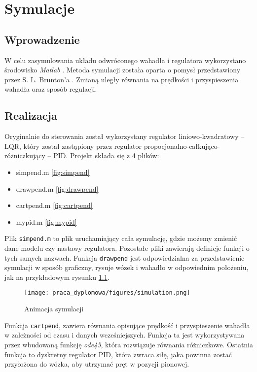 \chapter{Symulacje}

\section{Wprowadzenie}
W celu zasymulowania układu odwróconego wahadła i regulatora wykorzystano środowisko \textit{Matlab} \cite{matlab}. Metoda symulacji została oparta o pomysł przedstawiony przez S. L. Brunton'a \cite{Brun17}. Zmianą uległy równania na prędkości i przyspieszenia wahadła oraz sposób regulacji.

\section{Realizacja}
Oryginalnie do sterowania został wykorzystany regulator liniowo-kwadratowy -- LQR, który został  zastąpiony przez regulator propocjonalno-całkująco-różniczkujący -- PID. Projekt składa się z 4 plików:
\begin{itemize}
    \item simpend.m \ref{fig:simpend}
    \item drawpend.m \ref{fig:drawpend}
    \item cartpend.m \ref{fig:cartpend}
    \item mypid.m \ref{fig:mypid}
\end{itemize}
Plik \texttt{simpend.m} to plik uruchamiający cała symulację, gdzie możemy zmienić dane modelu czy nastawy regulatora. Pozostałe pliki zawierają definicje funkcji o tych samych nazwach. Funkcja \texttt{drawpend} jest odpowiedzialna za przedstawienie symulacji w sposób graficzny, rysuje wózek i wahadło w odpowiednim położeniu, jak na przykładowym rysunku \ref{fig:sim}.
\begin{figure}
    \centering
    \texttt{[image: praca\_dyplomowa/figures/simulation.png]}
    \caption{Animacja symulacji}
    \label{fig:sim}
\end{figure}
Funkcja \texttt{cartpend}, zawiera równania opisujące prędkość i przyspieszenie wahadła w zależności od czasu i danych wcześniejszych. Funkcja ta jest wykorzystywana przez wbudowaną funkcję \textit{ode45}, która rozwiązuje równania różniczkowe. Ostatnia funkcja to dyskretny regulator PID, która zwraca siłę, jaka powinna zostać przyłożona do wózka, aby utrzymać pręt w pozycji pionowej. 

